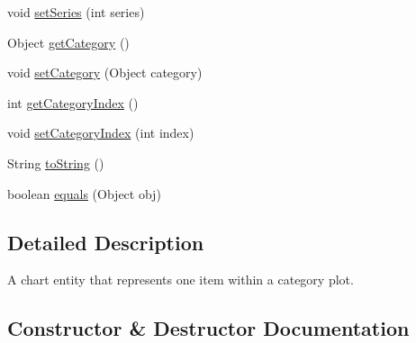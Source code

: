 \begin{DoxyCompactItemize}
\item 
void \mbox{\hyperlink{classorg_1_1jfree_1_1chart_1_1entity_1_1_category_item_entity_a914cb3b56be73223fa862fe797ab73df}{set\+Series}} (int series)
\item 
Object \mbox{\hyperlink{classorg_1_1jfree_1_1chart_1_1entity_1_1_category_item_entity_ae666760c5bb7e48704f020551dec0b5b}{get\+Category}} ()
\item 
void \mbox{\hyperlink{classorg_1_1jfree_1_1chart_1_1entity_1_1_category_item_entity_a23d787fb513e3f167b91eea19732214e}{set\+Category}} (Object category)
\item 
int \mbox{\hyperlink{classorg_1_1jfree_1_1chart_1_1entity_1_1_category_item_entity_ab7478ee780434b41127a0b3ac87887dc}{get\+Category\+Index}} ()
\item 
void \mbox{\hyperlink{classorg_1_1jfree_1_1chart_1_1entity_1_1_category_item_entity_af1892446208864ef07d1954e8c32b4cb}{set\+Category\+Index}} (int index)
\item 
String \mbox{\hyperlink{classorg_1_1jfree_1_1chart_1_1entity_1_1_category_item_entity_a085df739407e34a5fa1008ea12251bdf}{to\+String}} ()
\item 
boolean \mbox{\hyperlink{classorg_1_1jfree_1_1chart_1_1entity_1_1_category_item_entity_ab0b3547acc0c3ab0cde90aa788265de0}{equals}} (Object obj)
\end{DoxyCompactItemize}


\subsection{Detailed Description}
A chart entity that represents one item within a category plot. 

\subsection{Constructor \& Destructor Documentation}
\mbox{\label{classorg_1_1jfree_1_1chart_1_1entity_1_1_category_item_entity_aa543643db4a9ed68a1ccfc40b1c15f6a}} 

